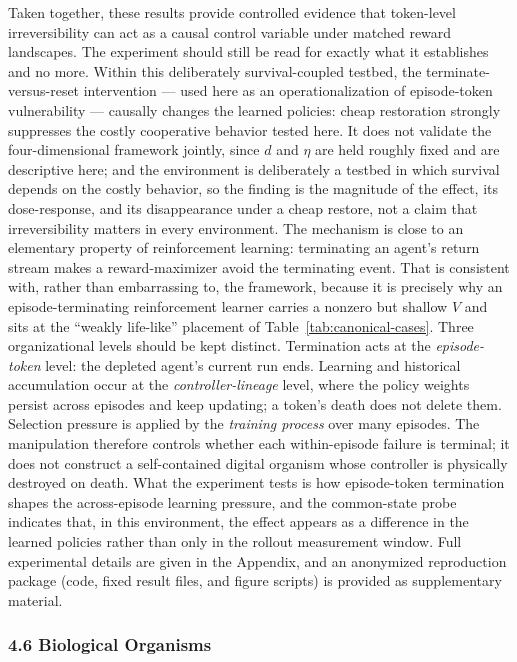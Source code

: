 \documentclass[Afour,sageh,times,doublespace]{sagej}
\begin{document}
Taken together, these results provide controlled evidence that token-level irreversibility can act as a causal control variable under matched reward landscapes. The experiment should still be read for exactly what it establishes and no more. Within this deliberately survival-coupled testbed, the terminate-versus-reset intervention --- used here as an operationalization of episode-token vulnerability --- causally changes the learned policies: cheap restoration strongly suppresses the costly cooperative behavior tested here. It does not validate the four-dimensional framework jointly, since \(d\) and \(\eta\) are held roughly fixed and are descriptive here; and the environment is deliberately a testbed in which survival depends on the costly behavior, so the finding is the magnitude of the effect, its dose-response, and its disappearance under a cheap restore, not a claim that irreversibility matters in every environment. The mechanism is close to an elementary property of reinforcement learning: terminating an agent's return stream makes a reward-maximizer avoid the terminating event. That is consistent with, rather than embarrassing to, the framework, because it is precisely why an episode-terminating reinforcement learner carries a nonzero but shallow \(V\) and sits at the ``weakly life-like'' placement of Table~\ref{tab:canonical-cases}. Three organizational levels should be kept distinct. Termination acts at the \emph{episode-token} level: the depleted agent's current run ends. Learning and historical accumulation occur at the \emph{controller-lineage} level, where the policy weights persist across episodes and keep updating; a token's death does not delete them. Selection pressure is applied by the \emph{training process} over many episodes. The manipulation therefore controls whether each within-episode failure is terminal; it does not construct a self-contained digital organism whose controller is physically destroyed on death. What the experiment tests is how episode-token termination shapes the across-episode learning pressure, and the common-state probe indicates that, in this environment, the effect appears as a difference in the learned policies rather than only in the rollout measurement window. Full experimental details are given in the Appendix, and an anonymized reproduction package (code, fixed result files, and figure scripts) is provided as supplementary material.

\subsubsection{4.6 Biological Organisms}\label{biological-organisms}
\end{document}
